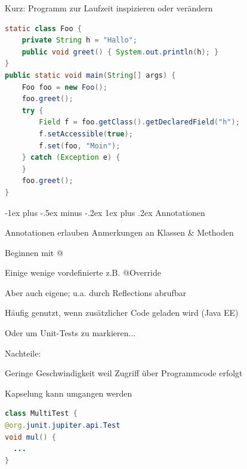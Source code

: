 \documentclass[10pt]{article}
\makeatletter
\renewcommand{\subsubsection}{\@startsection{subsubsection}{3}{0mm}%
                                {-1ex plus -.5ex minus -.2ex}%
                                {1ex plus .2ex}%
                                {\normalfont\small\bfseries}}
\makeatother
\begin{document}
Kurz: Programm zur Laufzeit inspizieren oder verändern

\begin{lstlisting}[language=java]
static class Foo {
    private String h = "Hallo";
    public void greet() { System.out.println(h); }
}
public static void main(String[] args) {
    Foo foo = new Foo();
    foo.greet();
    try {
        Field f = foo.getClass().getDeclaredField("h");
        f.setAccessible(true);
        f.set(foo, "Moin");
    } catch (Exception e) {
    }
    foo.greet();
}
\end{lstlisting}

\subsubsection{Annotationen}
\begin{itemize*}
  \item Annotationen erlauben Anmerkungen an Klassen \& Methoden
  \item Beginnen mit @
  \item Einige wenige vordefinierte z.B. @Override
  \item Aber auch eigene; u.a. durch Reflections abrufbar
  \item Häufig genutzt, wenn zusätzlicher Code geladen wird (Java EE)
  \item Oder um Unit-Tests zu markieren...
\item Nachteile:
\begin{itemize*}
  \item Geringe Geschwindigkeit weil Zugriff über Programmcode erfolgt
  \item Kapselung kann umgangen werden
\end{itemize*}
\end{itemize*}

\begin{lstlisting}[language=java]
class MultiTest {
@org.junit.jupiter.api.Test
void mul() {
  ...
}
\end{lstlisting}
\end{document}
